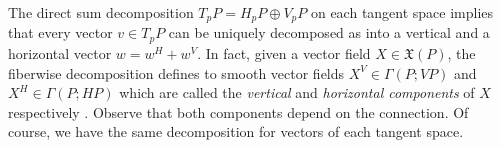 

The direct sum decomposition \(T_pP =H_pP \oplus V_pP\) on each tangent space implies that every vector \(v \in T_pP\) can be uniquely decomposed as into a vertical and a horizontal vector \(w=w^H + w^V\). In fact, given a vector field \(X \in \mathfrak{X}(P)\), the fiberwise decomposition defines to smooth vector fields \(X^V\in \Gamma(P; VP)\) and \(X^H\in \Gamma(P; HP)\) which are called the \textit{vertical} and \textit{horizontal components} of \(X\) respectively \parencite[Prop. 28.3]{tu2017differential}. Observe that both components depend on the connection. Of course, we have the same decomposition for vectors of each tangent space. 


